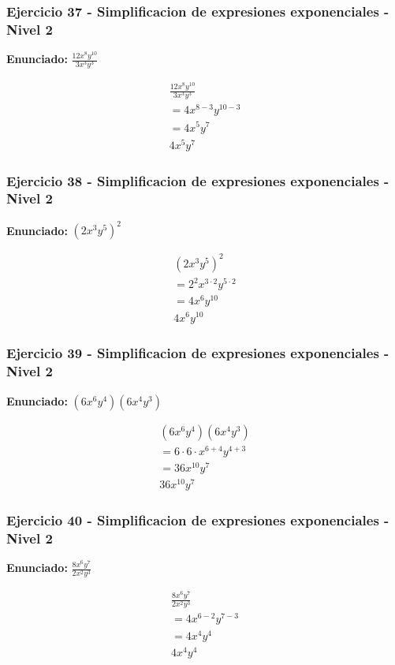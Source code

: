 \documentclass[12pt,a4paper]{article}
\begin{document}
\subsubsection*{Ejercicio 37 - Simplificacion de expresiones exponenciales - Nivel 2}
\textbf{Enunciado:} \(\frac{12x^{8}y^{10}}{3x^{3}y^{3}}\)

\[
\begin{aligned}
\frac{12x^{8}y^{10}}{3x^{3}y^{3}}\\
=4x^{8-3}y^{10-3}\\
=4x^{5}y^{7}\\
\boxed{4x^{5}y^{7}}
\end{aligned}
\]


\subsubsection*{Ejercicio 38 - Simplificacion de expresiones exponenciales - Nivel 2}
\textbf{Enunciado:} \(\left(2x^{3}y^{5}\right)^{2}\)

\[
\begin{aligned}
\left(2x^{3}y^{5}\right)^{2}\\
=2^{2}x^{3\cdot 2}y^{5\cdot 2}\\
=4x^{6}y^{10}\\
\boxed{4x^{6}y^{10}}
\end{aligned}
\]


\subsubsection*{Ejercicio 39 - Simplificacion de expresiones exponenciales - Nivel 2}
\textbf{Enunciado:} \((6x^{6}y^{4})(6x^{4}y^{3})\)

\[
\begin{aligned}
(6x^{6}y^{4})(6x^{4}y^{3})\\
=6\cdot 6\cdot x^{6+4}y^{4+3}\\
=36x^{10}y^{7}\\
\boxed{36x^{10}y^{7}}
\end{aligned}
\]


\subsubsection*{Ejercicio 40 - Simplificacion de expresiones exponenciales - Nivel 2}
\textbf{Enunciado:} \(\frac{8x^{6}y^{7}}{2x^{2}y^{3}}\)

\[
\begin{aligned}
\frac{8x^{6}y^{7}}{2x^{2}y^{3}}\\
=4x^{6-2}y^{7-3}\\
=4x^{4}y^{4}\\
\boxed{4x^{4}y^{4}}
\end{aligned}
\]
\end{document}
